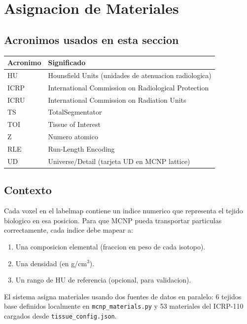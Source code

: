 \documentclass[12pt,a4paper]{article}
\begin{document}
\newpage

\section{Asignacion de Materiales}
\label{sec:materiales}

\subsection*{Acronimos usados en esta seccion}
\begin{tabular}{ll}
\toprule
\textbf{Acronimo} & \textbf{Significado} \\
\midrule
HU & Hounsfield Units (unidades de atenuacion radiologica) \\
ICRP & International Commission on Radiological Protection \\
ICRU & International Commission on Radiation Units \\
TS & TotalSegmentator \\
TOI & Tissue of Interest \\
Z & Numero atomico \\
RLE & Run-Length Encoding \\
UD & Universe/Detail (tarjeta UD en MCNP lattice) \\
\bottomrule
\end{tabular}

\subsection{Contexto}

Cada voxel en el labelmap contiene un indice numerico que representa el tejido biologico en esa posicion. Para que MCNP pueda transportar particulas correctamente, cada indice debe mapear a:

\begin{enumerate}
    \item Una composicion elemental (fraccion en peso de cada isotopo).
    \item Una densidad (en g/cm$^3$).
    \item Un rango de HU de referencia (opcional, para validacion).
\end{enumerate}

El sistema asigna materiales usando dos fuentes de datos en paralelo: 6 tejidos base definidos localmente en \texttt{mcnp\_materials.py} y 53 materiales del ICRP-110 cargados desde \texttt{tissue\_config.json}.
\end{document}
